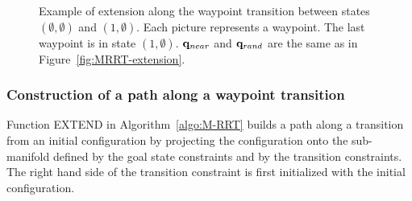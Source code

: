 \begin{figure}
\begin{center}
  \end{center}
  \caption{Example of extension along the waypoint transition between states
    $(\emptyset,\emptyset)$ and $(1,\emptyset)$. Each picture represents a
    waypoint. The last waypoint is in state $(1,\emptyset)$. $\mathbf{q}_{near}$
    and $\mathbf{q}_{rand}$ are the same as in Figure~\ref{fig:MRRT-extension}.}
  \label{fig:MRRT-extension-wp}
\end{figure}

\subsubsection{Construction of a path along a waypoint transition} Function
{\scriptsize EXTEND} in Algorithm~\ref{algo:M-RRT} builds a path along a
transition from an initial configuration by projecting the configuration
onto the sub-manifold defined by the goal state constraints and by the
transition constraints. The right hand side of the transition constraint is
first initialized with the initial configuration.

